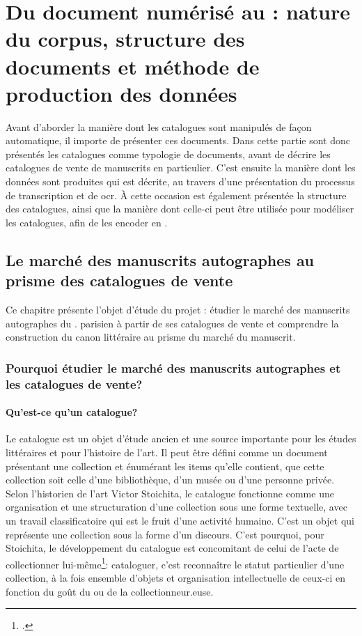 
\part{Du document numérisé au \xmltei: nature du corpus, structure des documents et méthode de production des données}

Avant d'aborder la manière dont les catalogues sont manipulés de façon automatique, il importe de présenter ces documents. Dans cette partie sont donc présentés les catalogues comme typologie de documents, avant de décrire les catalogues de vente de manuscrits en particulier. C'est ensuite la manière dont les données sont produites qui est décrite, au travers d'une présentation du processus de transcription et de \gls{ocr}. À cette occasion est également présentée la structure des catalogues, ainsi que la manière dont celle-ci peut être utilisée pour modéliser les catalogues, afin de les encoder en \xmltei{}.

\chapter{Le marché des manuscrits autographes au prisme des catalogues de vente}
Ce chapitre présente l'objet d'étude du projet \mss{} : étudier le marché des manuscrits autographes du . parisien à partir de ses catalogues de vente et comprendre la construction du canon littéraire au prisme du marché du manuscrit.

\section{Pourquoi étudier le marché des manuscrits autographes et les catalogues de vente?}
\subsection{Qu'est-ce qu'un catalogue?}
Le catalogue est un objet d'étude ancien et une source importante pour les études littéraires et pour l'histoire de l'art. Il peut être défini comme un document présentant une collection et énumérant les items qu'elle contient, que cette collection soit celle d'une bibliothèque, d'un musée ou d'une personne privée. Selon l'historien de l'art Victor Stoichita, le catalogue fonctionne comme une organisation et une structuration d'une collection sous une forme textuelle, avec un travail classificatoire qui est le fruit d'une activité humaine. C'est un objet qui représente une collection sous la forme d'un discours. C'est pourquoi, pour Stoichita, le développement du catalogue est concomitant de celui de l'acte de collectionner lui-même\footcite[p. 119-124]{stoichita_instauration_1993}: cataloguer, c'est reconnaître le statut particulier d'une collection, à la fois ensemble d'objets et organisation intellectuelle de ceux-ci en fonction du goût du ou de la collectionneur.euse.

